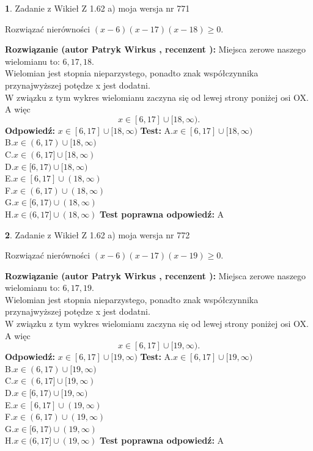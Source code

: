 \documentclass[12pt, a4paper]{article}
\theoremstyle{definition} %
\newtheorem{zad}{}
\newcommand{\zadStart}[1]{\begin{zad}#1\newline}
\newcommand{\zadStop}{\end{zad}}
\newcommand{\rozwStart}[2]{\noindent \textbf{Rozwiązanie (autor #1 , recenzent #2): }\newline}
\newcommand{\rozwStop}{\newline}
\newcommand{\odpStart}{\noindent \textbf{Odpowiedź:}\newline}
\newcommand{\odpStop}{\newline}
\newcommand{\testStart}{\noindent \textbf{Test:}\newline}
\newcommand{\testStop}{\newline}
\newcommand{\kluczStart}{\noindent \textbf{Test poprawna odpowiedź:}\newline}
\newcommand{\kluczStop}{\newline}
\begin{document}
\zadStart{Zadanie z Wikieł Z 1.62 a) moja wersja nr 771}

Rozwiązać nierówności $(x-6)(x-17)(x-18)\ge0$.
\zadStop
\rozwStart{Patryk Wirkus}{}
Miejsca zerowe naszego wielomianu to: $6, 17, 18$.\\
Wielomian jest stopnia nieparzystego, ponadto znak współczynnika przy\linebreak najwyższej potędze x jest dodatni.\\ W związku z tym wykres wielomianu zaczyna się od lewej strony poniżej osi OX. A więc $$x \in [6,17] \cup [18,\infty).$$
\rozwStop
\odpStart
$x \in [6,17] \cup [18,\infty)$
\odpStop
\testStart
A.$x \in [6,17] \cup [18,\infty)$\\
B.$x \in (6,17) \cup [18,\infty)$\\
C.$x \in (6,17] \cup [18,\infty)$\\
D.$x \in [6,17) \cup [18,\infty)$\\
E.$x \in [6,17] \cup (18,\infty)$\\
F.$x \in (6,17) \cup (18,\infty)$\\
G.$x \in [6,17) \cup (18,\infty)$\\
H.$x \in (6,17] \cup (18,\infty)$
\testStop
\kluczStart
A
\kluczStop



\zadStart{Zadanie z Wikieł Z 1.62 a) moja wersja nr 772}

Rozwiązać nierówności $(x-6)(x-17)(x-19)\ge0$.
\zadStop
\rozwStart{Patryk Wirkus}{}
Miejsca zerowe naszego wielomianu to: $6, 17, 19$.\\
Wielomian jest stopnia nieparzystego, ponadto znak współczynnika przy\linebreak najwyższej potędze x jest dodatni.\\ W związku z tym wykres wielomianu zaczyna się od lewej strony poniżej osi OX. A więc $$x \in [6,17] \cup [19,\infty).$$
\rozwStop
\odpStart
$x \in [6,17] \cup [19,\infty)$
\odpStop
\testStart
A.$x \in [6,17] \cup [19,\infty)$\\
B.$x \in (6,17) \cup [19,\infty)$\\
C.$x \in (6,17] \cup [19,\infty)$\\
D.$x \in [6,17) \cup [19,\infty)$\\
E.$x \in [6,17] \cup (19,\infty)$\\
F.$x \in (6,17) \cup (19,\infty)$\\
G.$x \in [6,17) \cup (19,\infty)$\\
H.$x \in (6,17] \cup (19,\infty)$
\testStop
\kluczStart
A
\kluczStop
\end{document}
